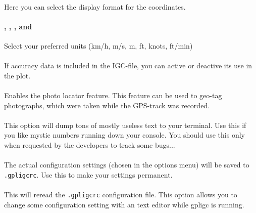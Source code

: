 \paragraph{}
Here you can select the display format for the coordinates.

\paragraph{
, , , and }
Select your preferred units (km/h, m/s, m, ft, knots, ft/min)

\paragraph{
}
If accuracy data is included in the IGC-file, you can active or deactive its use in the plot.

\paragraph{
}
Enables the photo locator feature. This feature can be used to geo-tag photographs, which were taken while the GPS-track was recorded.

\paragraph{
}
This option will dump tons of mostly useless text to your terminal. Use this if you like mystic numbers running down
your console. You should use this only when requested by the developers to track some bugs...

\paragraph{
}
The actual configuration settings (chosen in the options menu) will be saved to \texttt{.gpligcrc}.
Use this to make your settings permanent.

\paragraph{
}
This will reread the \texttt{.gpligcrc} configuration file.
This option allows you to change some configuration setting with an text editor while gpligc is running.



